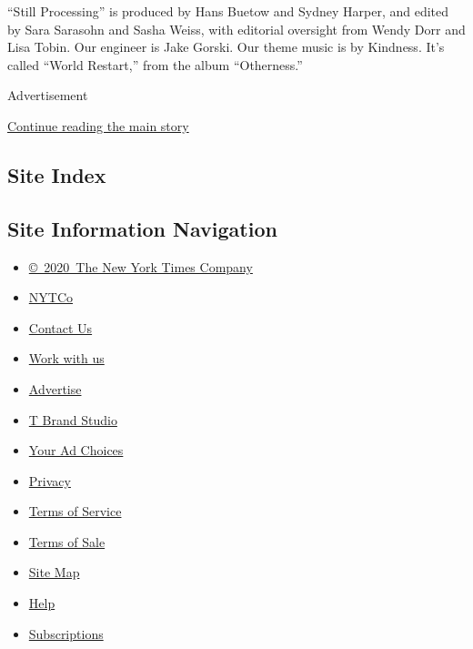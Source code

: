 ``Still Processing'' is produced by Hans Buetow and Sydney Harper, and
edited by Sara Sarasohn and Sasha Weiss, with editorial oversight from
Wendy Dorr and Lisa Tobin. Our engineer is Jake Gorski. Our theme music
is by Kindness. It's called ``World Restart,'' from the album
``Otherness.''

Advertisement

\protect\hyperlink{after-bottom}{Continue reading the main story}

\hypertarget{site-index}{%
\subsection{Site Index}\label{site-index}}

\hypertarget{site-information-navigation}{%
\subsection{Site Information
Navigation}\label{site-information-navigation}}

\begin{itemize}
\tightlist
\item
  \href{https://help.nytimes3xbfgragh.onion/hc/en-us/articles/115014792127-Copyright-notice}{©~2020~The
  New York Times Company}
\end{itemize}

\begin{itemize}
\tightlist
\item
  \href{https://www.nytco.com/}{NYTCo}
\item
  \href{https://help.nytimes3xbfgragh.onion/hc/en-us/articles/115015385887-Contact-Us}{Contact
  Us}
\item
  \href{https://www.nytco.com/careers/}{Work with us}
\item
  \href{https://nytmediakit.com/}{Advertise}
\item
  \href{http://www.tbrandstudio.com/}{T Brand Studio}
\item
  \href{https://www.nytimes3xbfgragh.onion/privacy/cookie-policy\#how-do-i-manage-trackers}{Your
  Ad Choices}
\item
  \href{https://www.nytimes3xbfgragh.onion/privacy}{Privacy}
\item
  \href{https://help.nytimes3xbfgragh.onion/hc/en-us/articles/115014893428-Terms-of-service}{Terms
  of Service}
\item
  \href{https://help.nytimes3xbfgragh.onion/hc/en-us/articles/115014893968-Terms-of-sale}{Terms
  of Sale}
\item
  \href{https://spiderbites.nytimes3xbfgragh.onion}{Site Map}
\item
  \href{https://help.nytimes3xbfgragh.onion/hc/en-us}{Help}
\item
  \href{https://www.nytimes3xbfgragh.onion/subscription?campaignId=37WXW}{Subscriptions}
\end{itemize}
